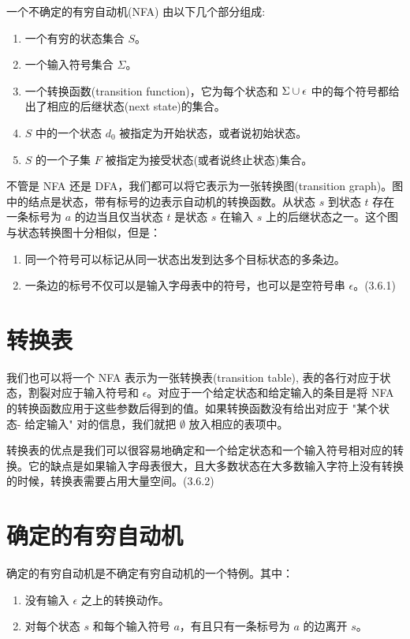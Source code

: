 一个不确定的有穷自动机(NFA) 由以下几个部分组成:
\begin{enumerate}
\item 一个有穷的状态集合 $S$。
\item 一个输入符号集合 $\Sigma$。
\item 一个转换函数(transition function)，它为每个状态和 $\Sigma \cup \\{ \epsilon \\}$ 中的每个符号都给出了相应的后继状态(next state)的集合。
\item $S$ 中的一个状态 $d_{0}$ 被指定为开始状态，或者说初始状态。
\item $S$ 的一个子集 $F$ 被指定为接受状态(或者说终止状态)集合。
\end{enumerate}

不管是 NFA 还是 DFA，我们都可以将它表示为一张转换图(transition graph)。图中的结点是状态，带有标号的边表示自动机的转换函数。从状态 $s$ 到状态 $t$ 存在一条标号为 $a$ 的边当且仅当状态 $t$ 是状态 $s$ 在输入 $s$ 上的后继状态之一。这个图与状态转换图十分相似，但是：

\begin{enumerate}
\item 同一个符号可以标记从同一状态出发到达多个目标状态的多条边。
\item 一条边的标号不仅可以是输入字母表中的符号，也可以是空符号串 $\epsilon$。(3.6.1)
\end{enumerate}

\section*{转换表}

我们也可以将一个 NFA 表示为一张转换表(transition table), 表的各行对应于状态，割裂对应于输入符号和 $\epsilon$。对应于一个给定状态和给定输入的条目是将 NFA 的转换函数应用于这些参数后得到的值。如果转换函数没有给出对应于 "某个状态- 给定输入" 对的信息，我们就把 $\emptyset$ 放入相应的表项中。

转换表的优点是我们可以很容易地确定和一个给定状态和一个输入符号相对应的转换。它的缺点是如果输入字母表很大，且大多数状态在大多数输入字符上没有转换的时候，转换表需要占用大量空间。(3.6.2)

\section*{确定的有穷自动机}

确定的有穷自动机是不确定有穷自动机的一个特例。其中：
\begin{enumerate}
\item 没有输入 $\epsilon$ 之上的转换动作。
\item 对每个状态 $s$ 和每个输入符号 $a$，有且只有一条标号为 $a$ 的边离开 $s$。
\end{enumerate}

